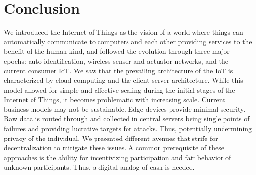 \section{Conclusion}

We introduced the Internet of Things as the vision of a world where things can automatically communicate to computers and each other providing services to the benefit of the human kind, and followed the evolution through three major epochs: auto-identification, wireless sensor and actuator networks, and the current consumer IoT. We saw that the prevailing architecture of the IoT is characterized by cloud computing and the client-server architecture. While this model allowed for simple and effective scaling during the initial stages of the Internet of Things, it becomes problematic with increasing scale. Current business models may not be sustainable. Edge devices provide minimal security. Raw data is routed through and collected in central servers being single points of failures and providing lucrative targets for attacks. Thus, potentially undermining privacy of the individual. We presented different avenues that strife for decentralization to mitigate these issues. A common prerequisite of these approaches is the ability for incentivizing participation and fair behavior of unknown participants. Thus, a digital analog of cash is needed. 


